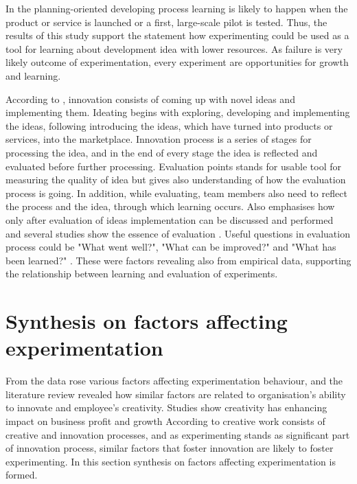 In the planning-oriented developing process learning is likely to happen when the product or service is launched or a first, large-scale pilot is tested. Thus, the results of this study support the statement how experimenting could be used as a tool for learning about development idea with lower resources. As failure is very likely outcome of experimentation, every experiment are opportunities for growth and learning. 

According to \citet{buijs2007innovation}, innovation consists of coming up with novel ideas and implementing them. Ideating begins with exploring, developing and implementing the ideas, following introducing the ideas, which have turned into products or services, into the marketplace. Innovation process is a series of stages for processing the idea, and in the end of every stage the idea is reflected and evaluated before further processing. Evaluation points stands for usable tool for measuring the quality of idea but gives also understanding of how the evaluation process is going. In addition, while evaluating, team members also need to reflect the process and the idea, through which learning occurs. Also \citep{runco1994problem} emphasises how only after evaluation of ideas implementation can be discussed and performed and several studies show the essence of evaluation \citep{mumford2002leading,vincent2002divergent}. Useful questions in evaluation process could be "What went well?", "What can be improved?" and "What has been learned?" \citep{buijs2007innovation}. These were factors revealing also from empirical data, supporting the relationship between learning and evaluation of experiments. 

\section{Synthesis on factors affecting experimentation} \label{fae}
From the data rose various factors affecting experimentation behaviour, and the literature review revealed how similar factors are related to organisation's ability to innovate and employee's creativity. Studies show creativity has enhancing impact on business profit and growth \citep{nystrom1990organizational} According to \citet{vincent2002divergent} creative work consists of creative and innovation processes, and as experimenting stands as significant part of innovation process, similar factors that foster innovation are likely to foster experimenting. In this section synthesis on factors affecting experimentation is formed.

